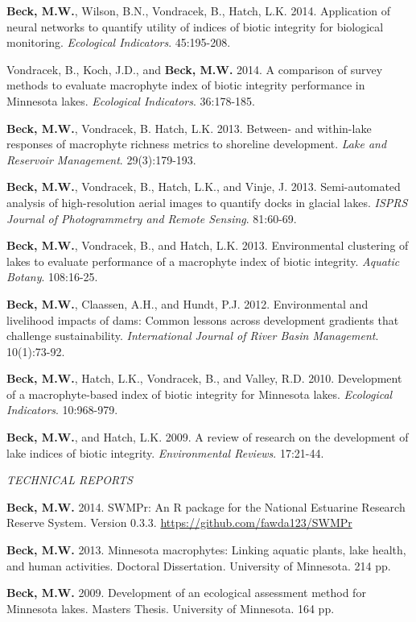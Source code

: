 \documentclass[letterpaper,12pt]{article}
\begin{document}
\textbf{Beck, M.W.}, Wilson, B.N., Vondracek, B., Hatch, L.K. 2014. Application of neural networks to quantify utility of indices of biotic integrity for biological monitoring. \textit{Ecological Indicators}. 45:195-208.

Vondracek, B., Koch, J.D., and \textbf{Beck, M.W.} 2014. A comparison of survey methods to evaluate macrophyte index of biotic integrity performance in Minnesota lakes. \textit{Ecological Indicators}. 36:178-185.

\textbf{Beck, M.W.}, Vondracek, B. Hatch, L.K. 2013. Between- and within-lake responses of macrophyte richness metrics to shoreline development. \textit{Lake and Reservoir Management}. 29(3):179-193.

\textbf{Beck, M.W.}, Vondracek, B., Hatch, L.K., and Vinje, J. 2013. Semi-automated analysis of high-resolution aerial images to quantify docks in glacial lakes. \textit{ISPRS Journal of Photogrammetry and Remote Sensing}. 81:60-69.

\textbf{Beck, M.W.}, Vondracek, B., and Hatch, L.K. 2013. Environmental clustering of lakes to evaluate performance of a macrophyte index of biotic integrity. \textit{Aquatic Botany}. 108:16-25.

\textbf{Beck, M.W.}, Claassen, A.H., and Hundt, P.J. 2012. Environmental and livelihood impacts of dams: Common lessons across development gradients that challenge sustainability. \textit{International Journal of River Basin Management}. 10(1):73-92.

\textbf{Beck, M.W.}, Hatch, L.K., Vondracek, B., and Valley, R.D. 2010. Development of a macrophyte-based index of biotic integrity for Minnesota lakes. \textit{Ecological Indicators}. 10:968-979.

\textbf{Beck, M.W.}, and Hatch, L.K. 2009. A review of research on the development of lake indices of biotic integrity. \textit{Environmental Reviews}. 17:21-44.

\vspace{\baselineskip} 
\centerline{\large{\textit{TECHNICAL REPORTS}}}

\textbf{Beck, M.W.} 2014. SWMPr: An R package for the National Estuarine Research Reserve System. Version 0.3.3. \href{https://github.com/fawda123/SWMPr}{https://github.com/fawda123/SWMPr}

\textbf{Beck, M.W.} 2013. Minnesota macrophytes: Linking aquatic plants, lake health, and human activities. Doctoral Dissertation. University of Minnesota. 214 pp.

\textbf{Beck, M.W.} 2009. Development of an ecological assessment method for Minnesota lakes. Masters Thesis. University of Minnesota. 164 pp.
\end{document}
